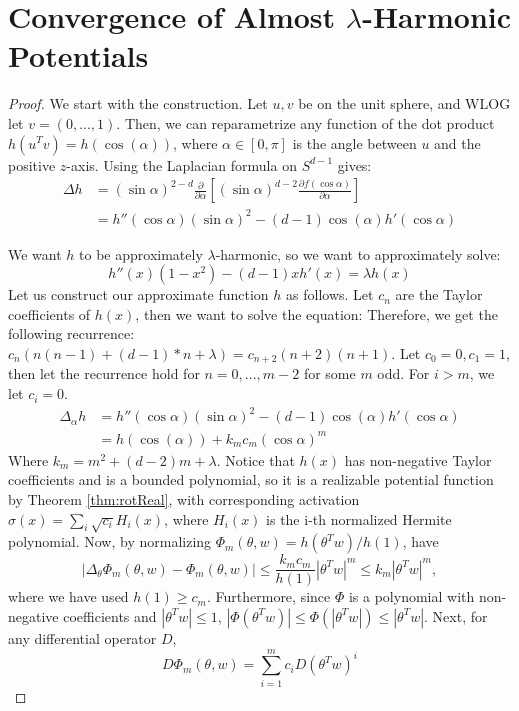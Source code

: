 

\section{Convergence of Almost $\lambda$-Harmonic Potentials}\label{App:EigenFunc}

\almostHarmonic*

\begin{proof}
We start with the construction. Let $u,v$ be on the unit sphere, and WLOG let $v = (0,...,1)$. Then, we can reparametrize any function of the dot product $h(u^Tv) = h(\cos(\alpha))$, where $\alpha \in [0, \pi]$ is the angle between $u$ and the positive $z$-axis.
Using the Laplacian formula on $S^{d-1}$ gives: \cite{Laplacian}
\begin{align*}
\Delta h & = (\sin \alpha)^{2-d} \frac{\partial}{\partial \alpha}\left[ (\sin \alpha)^{d-2} \frac{\partial f(\cos \alpha)}{\partial \alpha}\right] \\
& = h''(\cos\alpha)(\sin \alpha)^{2} - (d-1)\cos(\alpha)h'(\cos\alpha)
\end{align*}


We want $h$ to be approximately $\lambda$-harmonic, so we want to
approximately solve:
%
\[h''(x)(1-x^2) - (d-1)xh'(x) =  \lambda h(x) \]
%
Let us construct our approximate function $h$ as follows. Let $c_n$
are the Taylor coefficients of $h(x)$, then we want to solve the
equation: Therefore, we get the following recurrence:
$c_n (n(n-1) + (d-1)*n + \lambda) = c_{n+2} (n+2)(n+1)$. Let
$c_0 = 0, c_1 = 1$, then let the recurrence hold for $n=0,...,m-2$ for
some $m$ odd. For $i > m$, we let $c_i = 0$. 
\begin{align*}
\Delta_\alpha h & = h''(\cos\alpha)(\sin \alpha)^{2} - (d-1)\cos(\alpha)h'(\cos\alpha) \\
&= h(\cos(\alpha)) + k_mc_m(\cos\alpha)^m
\end{align*}
Where $k_m = m^2 + (d-2)m + \lambda$. Notice that $h(x)$ has
non-negative Taylor coefficients and is a bounded polynomial, so it is
a realizable potential function by Theorem \ref{thm:rotReal}, with
corresponding activation $\sigma(x) = \sum_{i} \sqrt{c_i} H_i(x)$,
where $H_i(x)$ is the i-th normalized Hermite polynomial. Now, by
normalizing $\Phi_m(\theta, w) = h(\theta^Tw)/h(1)$, have
%
\[|\Delta_\theta \Phi_m(\theta ,w) - \Phi_m(\theta,w) | \leq
\frac{k_mc_m}{h(1)} |\theta^Tw|^m \leq k_m|\theta^Tw|^m,\]
where we have used $h(1) \ge c_m.$
Furthermore, since $\Phi$ is a polynomial with non-negative coefficients and $|\theta^Tw|\leq 1$, $|\Phi(\theta^Tw)| \leq \Phi(|\theta^Tw|) \leq |\theta^Tw|$. Next, for any differential operator $D$, 
%
\[D\Phi_m(\theta, w) = \sum_{i=1}^m c_i D(\theta^T w)^i\]


\end{proof}
